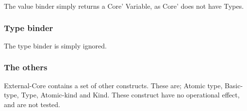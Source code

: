 The value binder simply returns a Core' Variable, as Core' does not have Types.


\subsubsection*{Type binder}

The type binder is simply ignored.

\subsubsection*{The others}

External-Core contains a set of other constructs. These are;
Atomic type, Basic-type, Type, Atomic-kind and Kind. These construct
have no operational effect, and are not tested.

\begin{comment}
\subsubsection*{Atomic type}

Types have no effect.

\subsubsection*{Basic type}

Types have no effect.

\subsubsection*{Type}

Types have no effect.

\subsubsection*{Atomic kind}

Kinds have no effect.

\subsubsection*{Kind}

Kinds have no effect.
\end{comment}

